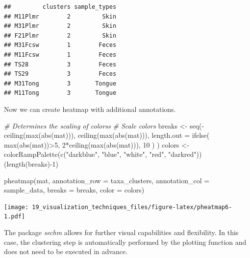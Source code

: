 \documentclass[
]{book}
\newenvironment{Shaded}{\begin{snugshade}}{\end{snugshade}}
\newcommand{\AttributeTok}[1]{\textcolor[rgb]{0.77,0.63,0.00}{#1}}
\newcommand{\CommentTok}[1]{\textcolor[rgb]{0.56,0.35,0.01}{\textit{#1}}}
\newcommand{\DecValTok}[1]{\textcolor[rgb]{0.00,0.00,0.81}{#1}}
\newcommand{\FunctionTok}[1]{\textcolor[rgb]{0.00,0.00,0.00}{#1}}
\newcommand{\NormalTok}[1]{#1}
\newcommand{\OtherTok}[1]{\textcolor[rgb]{0.56,0.35,0.01}{#1}}
\newcommand{\SpecialCharTok}[1]{\textcolor[rgb]{0.00,0.00,0.00}{#1}}
\newcommand{\StringTok}[1]{\textcolor[rgb]{0.31,0.60,0.02}{#1}}
\begin{document}
\begin{verbatim}
##         clusters sample_types
## M11Plmr        2         Skin
## M31Plmr        2         Skin
## F21Plmr        2         Skin
## M31Fcsw        1        Feces
## M11Fcsw        1        Feces
## TS28           3        Feces
## TS29           3        Feces
## M31Tong        3       Tongue
## M11Tong        3       Tongue
\end{verbatim}

Now we can create heatmap with additional annotations.

\begin{Shaded}
\begin{Highlighting}[]
\CommentTok{\# Determines the scaling of colorss}
\CommentTok{\# Scale colors}
\NormalTok{breaks }\OtherTok{\textless{}{-}} \FunctionTok{seq}\NormalTok{(}\SpecialCharTok{{-}}\FunctionTok{ceiling}\NormalTok{(}\FunctionTok{max}\NormalTok{(}\FunctionTok{abs}\NormalTok{(mat))), }\FunctionTok{ceiling}\NormalTok{(}\FunctionTok{max}\NormalTok{(}\FunctionTok{abs}\NormalTok{(mat))), }
              \AttributeTok{length.out =} \FunctionTok{ifelse}\NormalTok{( }\FunctionTok{max}\NormalTok{(}\FunctionTok{abs}\NormalTok{(mat))}\SpecialCharTok{\textgreater{}}\DecValTok{5}\NormalTok{, }\DecValTok{2}\SpecialCharTok{*}\FunctionTok{ceiling}\NormalTok{(}\FunctionTok{max}\NormalTok{(}\FunctionTok{abs}\NormalTok{(mat))), }\DecValTok{10}\NormalTok{ ) )}
\NormalTok{colors }\OtherTok{\textless{}{-}} \FunctionTok{colorRampPalette}\NormalTok{(}\FunctionTok{c}\NormalTok{(}\StringTok{"darkblue"}\NormalTok{, }\StringTok{"blue"}\NormalTok{, }\StringTok{"white"}\NormalTok{, }\StringTok{"red"}\NormalTok{, }\StringTok{"darkred"}\NormalTok{))(}\FunctionTok{length}\NormalTok{(breaks)}\SpecialCharTok{{-}}\DecValTok{1}\NormalTok{)}

\FunctionTok{pheatmap}\NormalTok{(mat, }\AttributeTok{annotation\_row =}\NormalTok{ taxa\_clusters, }
         \AttributeTok{annotation\_col =}\NormalTok{ sample\_data,}
         \AttributeTok{breaks =}\NormalTok{ breaks,}
         \AttributeTok{color =}\NormalTok{ colors)}
\end{Highlighting}
\end{Shaded}

\texttt{[image: 19\_visualization\_techniques\_files/figure-latex/pheatmap6-1.pdf]}

The package \emph{sechm} allows for further visual capabilities and flexibility.
In this case, the clustering step is automatically performed by the plotting
function and does not need to be executed in advance.
\end{document}
